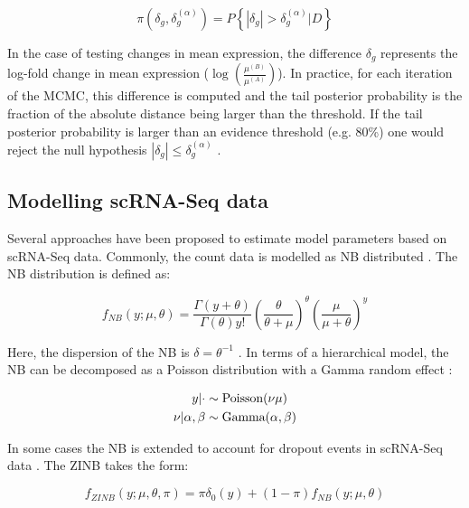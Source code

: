 \begin{equation}
\pi(\delta_g,\delta_g^{(\alpha)})=P\left\lbrace|\delta_g|>\delta_g^{(\alpha)}|D\right\rbrace
\end{equation}

In the case of testing changes in mean expression, the difference $\delta_g$ represents the log-fold change in mean expression ($\log(\frac{\mu^{(B)}}{\mu^{(A)}})$). In practice, for each iteration of the MCMC, this difference is computed and the tail posterior probability is the fraction of the absolute distance being larger than the threshold. If the tail posterior probability is larger than an evidence threshold (e.g. 80\%) one would reject the null hypothesis $|\delta_g|\leq\delta_g^{(\alpha)}$ \citep{Vallejos2016}. 

\subsection{Modelling scRNA-Seq data}

Several approaches have been proposed to estimate model parameters based on scRNA-Seq data. Commonly, the count data is modelled as \gls{NB} distributed \citep{Vallejos2015BASiCS, Risso2018, Lopez2018}. The NB distribution is defined as:

\begin{equation}
f_{NB}(y;\mu,\theta)=\frac{\Gamma(y+\theta)}{\Gamma(\theta)y!}\left(\frac{\theta}{\theta + \mu}\right)^\theta\left(\frac{\mu}{\mu + \theta}\right)^y
\end{equation}

Here, the dispersion of the NB is $\delta=\theta^{-1}$ \cite{Risso2018}. In terms of a hierarchical model, the NB can be decomposed as a Poisson distribution with a Gamma random effect \cite{Vallejos2015BASiCS}:

\begin{align*}
y|\cdot&\sim{}\textnormal{Poisson}(\nu\mu)\\
\nu|\alpha,\beta&\sim{}\textnormal{Gamma}(\alpha,\beta)
\end{align*}

In some cases \citep{Risso2018, Lopez2018} the NB is extended to account for dropout events in scRNA-Seq data \citep{Kharchenko2015}. The \gls{ZINB} takes the form:

\begin{equation}
f_{ZINB}(y;\mu,\theta,\pi)=\pi\delta_0(y) + (1-\pi)f_{NB}(y;\mu,\theta) 
\end{equation}

